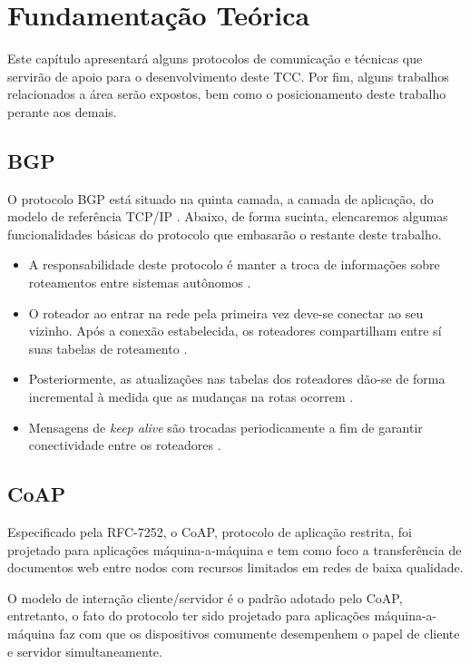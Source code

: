 \chapter{\label{chap:chap2} Fundamentação Teórica}

Este capítulo apresentará alguns protocolos de comunicação e técnicas que servirão de apoio para o desenvolvimento deste TCC. 
Por fim, alguns trabalhos relacionados a área serão expostos, bem como o posicionamento deste trabalho perante aos demais.

\section{BGP}


O protocolo BGP está situado na quinta camada, a camada de aplicação, do modelo de referência TCP/IP \cite{tanenbaum2011redes}.
Abaixo, de forma sucinta, elencaremos algumas funcionalidades básicas do protocolo que embasarão o restante deste trabalho.

\begin{itemize}
    \item A responsabilidade deste protocolo é manter a troca de informações sobre roteamentos entre sistemas autônomos \cite{Rekhter:1995}.
    \item O roteador ao entrar na rede pela primeira vez deve-se conectar ao seu vizinho. Após a conexão estabelecida, os roteadores compartilham entre sí suas tabelas de roteamento \cite{Rekhter:1995}.
    \item Posteriormente, as atualizações nas tabelas dos roteadores dão-se de forma incremental à medida que as mudanças na rotas ocorrem \cite{Rekhter:1995}.
    \item Mensagens de \textit{keep alive} são trocadas periodicamente a fim de garantir conectividade entre os roteadores \cite{Rekhter:1995}.
\end{itemize}

\section{CoAP}

Especificado pela RFC-7252, o CoAP, protocolo de aplicação restrita, foi projetado para aplicações máquina-a-máquina
e tem como foco a transferência de documentos web entre nodos com recursos limitados em redes de baixa qualidade\cite{rfc7252}.


O modelo de interação cliente/servidor é o padrão adotado pelo CoAP, entretanto,
o fato do protocolo ter sido projetado para aplicações máquina-a-máquina faz com que os dispositivos comumente desempenhem o papel de cliente e servidor simultaneamente.

